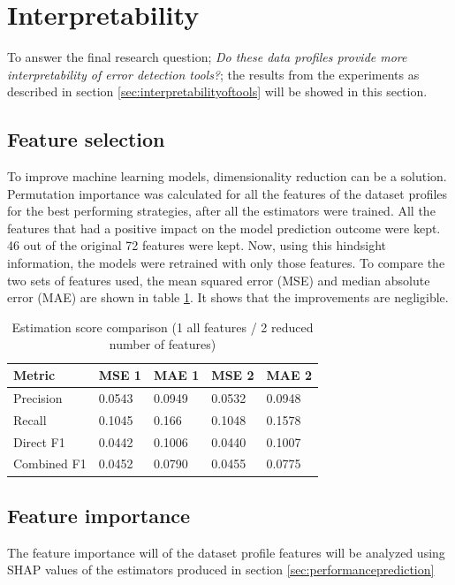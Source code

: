\newpage
\section{Interpretability}
To answer the final research question; \textit{Do these data profiles provide more interpretability of error detection tools?}; the results from the experiments as described in section \ref{sec:interpretabilityoftools} will be showed in this section.

\subsection{Feature selection}
To improve machine learning models, dimensionality reduction can be a solution. Permutation importance was calculated for all the features of the dataset profiles for the best performing strategies, after all the estimators were trained. All the features that had a positive impact on the model prediction outcome were kept. 46 out of the original 72 features were kept. Now, using this hindsight information, the models were retrained with only those features. To compare the two sets of features used, the mean squared error (MSE) and median absolute error (MAE) are shown in table \ref{tab:improvements_feature_selection}. It shows that the improvements are negligible.

\begin{table}[h]
\centering
\begin{tabular}{l|ll|ll}
\textbf{Metric} & \textbf{MSE 1} & \textbf{MAE 1} & \textbf{MSE 2} & \textbf{MAE 2} \\ \hline
Precision       & 0.0543         & 0.0949         & 0.0532         & 0.0948         \\
Recall          & 0.1045         & 0.166          & 0.1048         & 0.1578         \\
Direct F1       & 0.0442         & 0.1006         & 0.0440         & 0.1007         \\
Combined F1     & 0.0452         & 0.0790         & 0.0455         & 0.0775        
\end{tabular}
\caption{Estimation score comparison (1 all features / 2 reduced number of features)}
\label{tab:improvements_feature_selection}
\end{table}


\subsection{Feature importance}
The feature importance will of the dataset profile features will be analyzed using SHAP values of the estimators produced in section \ref{sec:performanceprediction}

